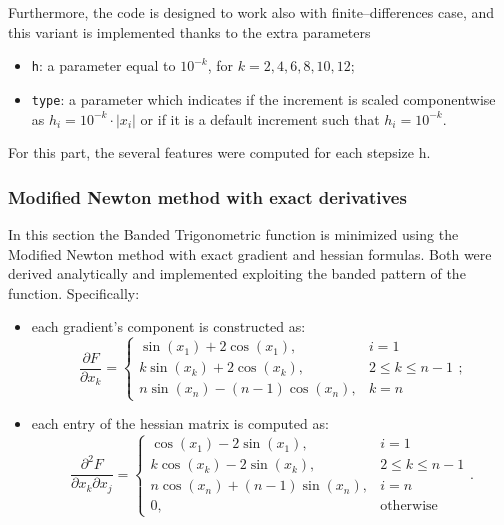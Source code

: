 \documentclass[a4paper,12pt]{article}
\begin{document}
	\noindent Furthermore, the code is designed to work also with finite--differences case,  and this variant is implemented thanks to the extra parameters 
	\begin{itemize}
		\item \texttt{h}: a parameter equal to \(10^{-k} \), for \( k = 2, 4, 6, 8, 10, 12 \);
		\item \texttt{type}: a parameter which indicates if the increment is scaled componentwise as \( h_i = 10^{-k} \cdot |x_i| \) or if it is a default increment such that \( h_i = 10^{-k}\). 
	\end{itemize}
	
	\noindent For this part, the several features were computed for each stepsize h.	
	\subsubsection{Modified Newton method with exact derivatives}
		
	In this section the Banded Trigonometric function is minimized using the Modified Newton method with exact gradient and hessian formulas. Both were derived analytically and implemented exploiting the banded pattern of the function. Specifically:

	\begin{itemize}
		\item each gradient's component is constructed as: 
		\[
		\frac{\partial F}{\partial x_k} = 
		\begin{cases}
			\sin(x_{1}) + 2\cos(x_{1}), & i = 1 \\
			k\sin(x_{k}) + 2\cos(x_{k}), & 2 \le k \le n-1 \\
			n\sin(x_n) - (n-1)\cos(x_n), & k = n
		\end{cases};
		\]
		\item each entry of the hessian matrix is computed as:
		\[
		\frac{\partial^2 F}{\partial x_k \partial x_j} = 
		\begin{cases}
			\cos(x_{1}) - 2\sin(x_{1}), & i = 1 \\
			k\cos(x_{k}) - 2\sin(x_{k}), & 2 \le k \le n-1 \\
			n\cos(x_n) + (n-1)\sin(x_n), & i = n\\
			0, &  \text{otherwise}
		\end{cases}.
		\]
		\end{itemize} 
	
	\medskip
	
\end{document}
